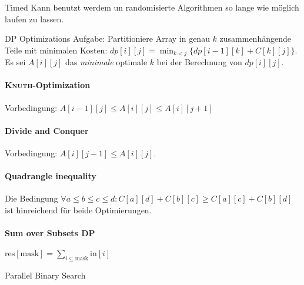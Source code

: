 \begin{algorithm}{Timed}
	Kann benutzt werdem un randomisierte Algorithmen so lange wie möglich laufen zu lassen.
\end{algorithm}

\begin{algorithm}{DP Optimizations}
	Aufgabe: Partitioniere Array in genau $k$ zusammenhängende Teile mit minimalen Kosten:
	$dp[i][j] = \min_{k<j}\{dp[i-1][k]+C[k][j]\}$. Es sei $A[i][j]$ das \emph{minimale} optimale
	$k$ bei der Berechnung von $dp[i][j]$.
	
	\paragraph{\textsc{Knuth}-Optimization} Vorbedingung: $A[i - 1][j] \leq A[i][j] \leq A[i][j + 1]$
	
	
	\paragraph{Divide and Conquer}
	Vorbedingung: $A[i][j - 1] \leq A[i][j]$.
	
	
	\paragraph{Quadrangle inequality} Die Bedingung  $\forall a\leq b\leq c\leq d:
	C[a][d] + C[b][c] \geq C[a][c] + C[b][d]$ ist hinreichend für beide Optimierungen.
	
	\paragraph{Sum over Subsets DP} $\text{res}[\text{mask}]=\sum_{i\subseteq\text{mask}}\text{in}[i]$
\end{algorithm}

\begin{algorithm}{Parallel Binary Search}
\end{algorithm}

